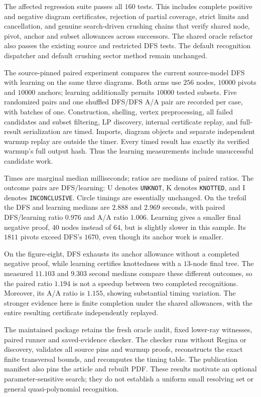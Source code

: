 The affected regression suite passes all $160$ tests.  This includes complete
positive and negative diagram certificates, rejection of partial coverage,
strict limits and cancellation, and genuine search-driven crushing chains
that verify shared node, pivot, anchor and subset allowances across successors.
The shared oracle refactor also passes the existing source and restricted
DFS tests.  The default recognition dispatcher and default crushing sector
method remain unchanged.

The source-pinned paired experiment compares the current source-model DFS
with learning on the same three diagrams.  Both arms use $256$ nodes,
$10000$ pivots and $10000$ anchors; learning additionally permits $10000$
tested subsets.  Five randomized pairs and one shuffled DFS/DFS A/A pair
are recorded per case, with batches of one.  Construction, shelling, vertex
preprocessing, all failed candidates and subset filtering, LP discovery,
internal certificate replay, and full-result serialization are timed.
Imports, diagram objects and separate independent warmup replay are outside
the timer.  Every timed result has exactly its verified warmup's full output
hash.  Thus the learning measurements include unsuccessful candidate work.

\begin{center}
\small
\setlength{\tabcolsep}{3pt}

\end{center}

Times are marginal median milliseconds; ratios are medians of paired ratios.
The outcome pairs are DFS/learning: U denotes \texttt{UNKNOT}, K denotes
\texttt{KNOTTED}, and I denotes \texttt{INCONCLUSIVE}.  Circle timings are
essentially unchanged.  On the trefoil the DFS and learning medians are
$2.888$ and $2.969$ seconds, with paired DFS/learning ratio $0.976$ and A/A
ratio $1.006$.  Learning gives a smaller final negative proof, $40$ nodes
instead of $64$, but is slightly slower in this sample.  Its $1811$ pivots
exceed DFS's $1670$, even though its anchor work is smaller.

On the figure-eight, DFS exhausts its anchor allowance without a completed
negative proof, while learning certifies knottedness with a $13$-node final
tree.  The measured $11.103$ and $9.303$ second medians compare these different
outcomes, so the paired ratio $1.194$ is not a speedup between two completed
recognitions.  Moreover, its A/A ratio is $1.155$, showing substantial timing
variation.  The stronger evidence here is finite completion under the shared
allowances, with the entire resulting certificate independently replayed.

The maintained package  retains the
fresh oracle audit, fixed lower-ray witnesses, paired runner and saved-evidence
checker.  The checker runs without Regina or discovery, validates all source
pins and warmup proofs, reconstructs the exact finite transversal bounds, and
recomputes the timing table.  The publication manifest also pins the article
and rebuilt PDF.  These results motivate an optional parameter-sensitive
search; they do not establish a uniform small resolving set or general
quasi-polynomial recognition.
